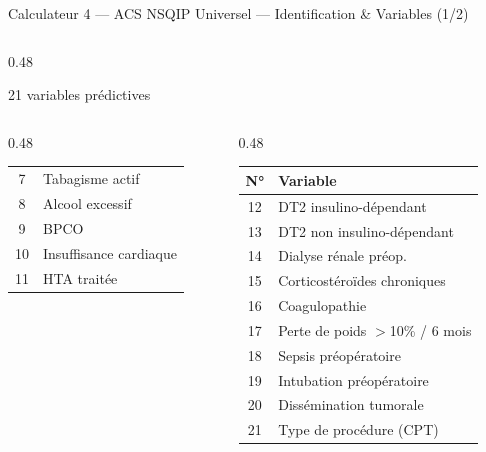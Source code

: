 \documentclass[aspectratio=169]{beamer}
\begin{document}
\begin{frame}{Calculateur 4 --- ACS NSQIP Universel --- Identification \& Variables (1/2)}
\begin{columns}[T]
\begin{column}{0.48\textwidth}
\begin{block}{21 variables prédictives}
\begin{columns}[T]
\begin{column}{0.48\textwidth}
\begin{tabular}{cl}
        7    & Tabagisme actif \\
        8    & Alcool excessif \\
        9    & BPCO \\
        10   & Insuffisance cardiaque \\
        11   & HTA traitée \\
        \bottomrule
      \end{tabular}
    \end{column}
    \begin{column}{0.48\textwidth}
      \begin{tabular}{cl}
        \toprule
        \textbf{N°} & \textbf{Variable} \\
        \midrule
        12   & DT2 insulino-dépendant \\
        13   & DT2 non insulino-dépendant \\
        14   & Dialyse rénale préop. \\
        15   & Corticostéroïdes chroniques \\
        16   & Coagulopathie \\
        17   & Perte de poids $>$10\% / 6 mois \\
        18   & Sepsis préopératoire \\
        19   & Intubation préopératoire \\
        20   & Dissémination tumorale \\
        21   & Type de procédure (CPT) \\
        \bottomrule
      \end{tabular}
    \end{column}
  \end{columns}
\end{block}
    \end{column}
  \end{columns}
\end{frame}
\end{document}
